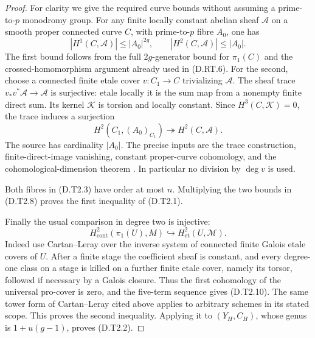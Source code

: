 \begin{proof}
For clarity we give the required curve bounds without
assuming a prime-to-$p$ monodromy group. For any finite
locally constant abelian sheaf $\mathcal A$ on a smooth
proper connected curve $C$, with prime-to-$p$ fibre
$A_0$, one has
\[
 |H^1(C,\mathcal A)|\leq |A_0|^{2g},\qquad
 |H^2(C,\mathcal A)|\leq |A_0|.
                                                        \tag{D.T2.8}
\]
The first bound follows from the full $2g$-generator
bound for $\pi_1(C)$ and the crossed-homomorphism argument
already used in (D.RT.6). For the second, choose a
connected finite etale cover $v:C_1\to C$ trivializing
$\mathcal A$. The sheaf trace
$v_*v^*\mathcal A\to\mathcal A$ is surjective: etale
locally it is the sum map from a nonempty finite direct
sum. Its kernel $\mathcal K$ is torsion and locally
constant. Since $H^3(C,\mathcal K)=0$, the trace induces
a surjection
\[
 H^2(C_1,(A_0)_{C_1})\twoheadrightarrow
                           H^2(C,\mathcal A).
                                                        \tag{D.T2.9}
\]
The source has cardinality $|A_0|$. The precise inputs
are the trace construction, finite-direct-image
vanishing, constant proper-curve cohomology, and the
cohomological-dimension theorem
\citep[Tags 03SH, 03QP, 03RQ and Theorem 59.83.10
in Tag 03SB]{StacksTameTwistedH2B}. In particular no
division by $\deg v$ is used.

Both fibres in (D.T2.3) have order at most $n$.
Multiplying the two bounds in (D.T2.8) proves the first
inequality of (D.T2.1).

Finally the usual comparison in degree two is injective:
\[
 H^2_{\mathrm{cont}}(\pi_1(U),M)
               \hookrightarrow H^2_{\mathrm{et}}(U,\mathcal M).
                                                        \tag{D.T2.10}
\]
Indeed use Cartan--Leray over the inverse system of
connected finite Galois etale covers of $U$. After a
finite stage the coefficient sheaf is constant, and
every degree-one class on a stage is killed on a
further finite etale cover, namely its torsor, followed
if necessary by a Galois closure. Thus the first
cohomology of the universal pro-cover is zero, and the
five-term sequence gives (D.T2.10). The same tower
form of Cartan--Leray cited above applies to arbitrary
schemes in its stated scope. This proves the second
inequality. Applying it to $(Y_H,C_H)$, whose genus
is $1+u(g-1)$, proves (D.T2.2).
\end{proof}
